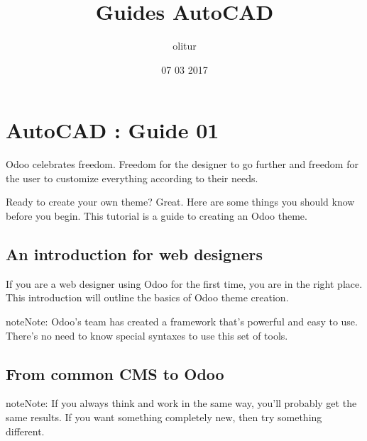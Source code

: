 \documentclass[a4paper,10pt,french]{sphinxmanual}
\title{Guides AutoCAD}
\date{07 03 2017}
\author{olitur}
\begin{document}
\maketitle
\sphinxtableofcontents
{}\label{\detokenize{docs/guides/index::doc}}



\chapter{AutoCAD : Guide 01}
\label{\detokenize{docs/guides/autocad-guide01:autocad-guide01}}\label{\detokenize{docs/guides/autocad-guide01::doc}}\label{\detokenize{docs/guides/autocad-guide01:acad-guides}}\label{\detokenize{docs/guides/autocad-guide01:autocad-guide-01}}\label{\detokenize{docs/guides/autocad-guide01:guides-acad}}
Odoo celebrates freedom. Freedom for the designer to go further and
freedom for the user to customize everything according to their needs.

Ready to create your own theme? Great. Here are some things you should know before you begin. This tutorial is a guide to creating an Odoo theme.

\noindent{}


\section{An introduction for web designers}
\label{\detokenize{docs/guides/autocad-guide01:an-introduction-for-web-designers}}
If you are a web designer using Odoo for the first time, you are in the right place.
This introduction will outline the basics of Odoo theme creation.

\begin{sphinxadmonition}{note}{Note:}
Odoo’s team has created a framework that’s powerful and easy to use. There’s no need to know special syntaxes to use this set of tools.
\end{sphinxadmonition}


\section{From common CMS to Odoo}
\label{\detokenize{docs/guides/autocad-guide01:from-common-cms-to-odoo}}
\begin{sphinxadmonition}{note}{Note:}
If you always think and work in the same way, you’ll probably get the same results. If you want something completely new,  then try something different.
\end{sphinxadmonition}
\end{document}

